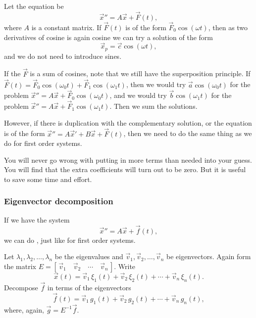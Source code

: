 \documentclass{ximera}
\begin{document}

Let the equation be
\begin{equation*}
    {\vec{x}}'' = A \vec{x} + \vec{F}(t) ,
\end{equation*}
where $A$ is a constant matrix.  If $\vec{F}(t)$ is of the form $\vec{F}_0 \cos (\omega t)$, then as two derivatives of cosine is again cosine we can try a solution of the form
\begin{equation*}
    \vec{x}_p = \vec{c} \cos (\omega t) ,
\end{equation*}
and we do not need to introduce sines.

If the $\vec{F}$ is a sum of cosines, note that we still have the superposition principle. If $\vec{F}(t) = \vec{F}_0 \cos (\omega_0 t) + \vec{F}_1 \cos (\omega_1 t)$, then we would try
$\vec{a} \cos (\omega_0 t)$ for the problem ${\vec{x}}'' = A \vec{x} + \vec{F}_0 \cos (\omega_0 t)$, and we would try
$\vec{b} \cos (\omega_1 t)$ for the problem ${\vec{x}}'' = A \vec{x} + \vec{F}_1 \cos (\omega_1 t)$.  Then we sum the solutions.

However, if there is duplication with the complementary solution, or the equation is of the form ${\vec{x}}'' = A{\vec{x}}'+ B \vec{x} + \vec{F}(t)$, then we need to do the same thing as we do for first order systems.

You will never go wrong with putting in more terms than needed into your guess.  You will find that the extra coefficients will turn out to be zero.  But it is useful to save some time and effort.

\subsubsection{Eigenvector decomposition}

If we have the system
\begin{equation*}
    {\vec{x}}'' = A \vec{x} + \vec{f}(t) ,
\end{equation*}
we can do \emph{}, just like for first order systems.

Let $\lambda_1, \lambda_2, \ldots, \lambda_n$ be the eigenvalues and $\vec{v}_1, \vec{v}_2, \ldots, \vec{v}_n$ be eigenvectors. Again form the matrix %
$E = [\, \vec{v}_1 \quad \vec{v}_2 \quad \cdots \quad \vec{v}_n \,]$. Write
\begin{equation*}
    \vec{x}(t) = \vec{v}_1 \, \xi_1(t) + \vec{v}_2 \, \xi_2(t) + \cdots + \vec{v}_n \, \xi_n(t) .
\end{equation*}
Decompose $\vec{f}$ in terms of the eigenvectors
\begin{equation*}
    \vec{f}(t) = \vec{v}_1 \, g_1(t) + \vec{v}_2 \, g_2(t) + \cdots + \vec{v}_n \, g_n(t) ,
\end{equation*}
where, again, $\vec{g} = E^{-1} \vec{f}$.
\end{document}
